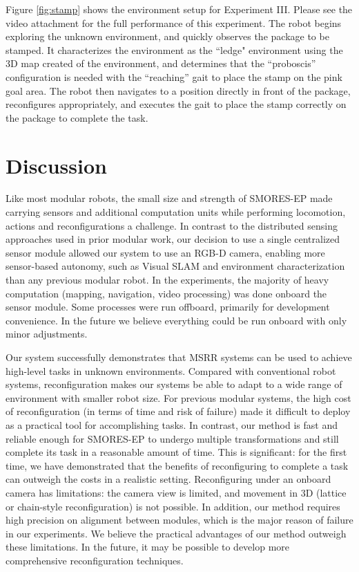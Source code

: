 \documentclass[conference]{IEEEtran}
\begin{document}
Figure \ref{fig:stamp} shows the environment setup for Experiment III. Please see the video attachment for the full performance of this experiment. The robot begins exploring the unknown environment, and quickly observes the package to be stamped. It characterizes the environment as the ``ledge" environment using the 3D map created of the environment, and determines that the ``proboscis'' configuration is needed with the ``reaching'' gait to place the stamp on the pink goal area. The robot then navigates to a position directly in front of the package, reconfigures appropriately, and executes the gait to place the stamp correctly on the package to complete the task.

\section{Discussion}
\label{sec:discussion}
%
Like most modular robots, the small size and strength of SMORES-EP made carrying sensors and additional computation units while performing locomotion, actions and reconfigurations a challenge.  
In contrast to the distributed sensing approaches used in prior modular work, our decision to use a single centralized sensor module allowed our system to use an RGB-D camera, enabling more sensor-based autonomy, such as Visual SLAM and environment characterization than any previous modular robot.  
In the experiments, the majority of heavy computation (mapping, navigation, video processing) was done onboard the sensor module.  
Some processes were run offboard, primarily for development convenience.  
In the future we believe everything could be run onboard with only minor adjustments.

Our system successfully demonstrates that MSRR systems can be used to achieve high-level tasks in unknown environments.
Compared with conventional robot systems, reconfiguration makes our systems be able to adapt to a wide range of environment with smaller robot size. 
For previous modular systems, the high cost of reconfiguration (in terms of time and risk of failure) made it difficult to deploy as a practical tool for accomplishing tasks.  
In contrast, our method is fast and reliable enough for SMORES-EP to undergo multiple transformations and still complete its task in a reasonable amount of time.  
This is significant: for the first time, we have demonstrated that the benefits of reconfiguring to complete a task can outweigh the costs in a realistic setting.  
Reconfiguring under an onboard camera has limitations: the camera view is limited, and movement in 3D (lattice or chain-style reconfiguration) is not possible. 
In addition, our method requires high precision on alignment between modules, which is the major reason of failure in our experiments. 
We believe the practical advantages of our method outweigh these limitations.  
In the future, it may be possible to develop more comprehensive reconfiguration techniques.
\end{document}
